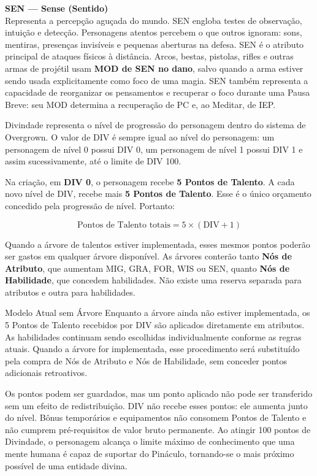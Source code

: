 \noindent
\textbf{\baskerfamily\large SEN — Sense (Sentido)}\\
Representa a percepção aguçada do mundo. SEN engloba testes de observação, intuição e detecção. 
Personagens atentos percebem o que outros ignoram: sons, mentiras, presenças invisíveis e pequenas aberturas na defesa. SEN é o atributo principal de ataques físicos à distância. Arcos, bestas, pistolas, rifles e outras armas de projétil usam \textbf{MOD de SEN no dano}, salvo quando a arma estiver sendo usada explicitamente como foco de uma magia. SEN também representa a capacidade de reorganizar os pensamentos e recuperar o foco durante uma Pausa Breve: seu MOD determina a recuperação de PC e, ao Meditar, de IEP.



Divindade representa o nível de progressão do personagem dentro do sistema de Overgrown. O valor de DIV é sempre igual ao nível do personagem: um personagem de nível 0 possui DIV 0, um personagem de nível 1 possui DIV 1 e assim sucessivamente, até o limite de DIV 100.

Na criação, em \textbf{DIV 0}, o personagem recebe \textbf{5 Pontos de Talento}. A cada novo nível de DIV, recebe mais \textbf{5 Pontos de Talento}. Esse é o único orçamento concedido pela progressão de nível. Portanto:

\[\text{Pontos de Talento totais}=5\times(\text{DIV}+1)\]

Quando a árvore de talentos estiver implementada, esses mesmos pontos poderão ser gastos em qualquer árvore disponível. As árvores conterão tanto \textbf{Nós de Atributo}, que aumentam MIG, GRA, FOR, WIS ou SEN, quanto \textbf{Nós de Habilidade}, que concedem habilidades. Não existe uma reserva separada para atributos e outra para habilidades.

\begin{rpgboxtips}{Modelo Atual sem Árvore}
Enquanto a árvore ainda não estiver implementada, os 5 Pontos de Talento recebidos por DIV são aplicados diretamente em atributos. As habilidades continuam sendo escolhidas individualmente conforme as regras atuais. Quando a árvore for implementada, esse procedimento será substituído pela compra de Nós de Atributo e Nós de Habilidade, sem conceder pontos adicionais retroativos.
\end{rpgboxtips}

Os pontos podem ser guardados, mas um ponto aplicado não pode ser transferido sem um efeito de redistribuição. DIV não recebe esses pontos: ele aumenta junto do nível. Bônus temporários e equipamentos não consomem Pontos de Talento e não cumprem pré-requisitos de valor bruto permanente.
Ao atingir 100 pontos de Divindade, o personagem alcança o limite máximo de conhecimento que uma mente humana 
é capaz de suportar do Pináculo, tornando-se o mais próximo possível de uma entidade divina.

